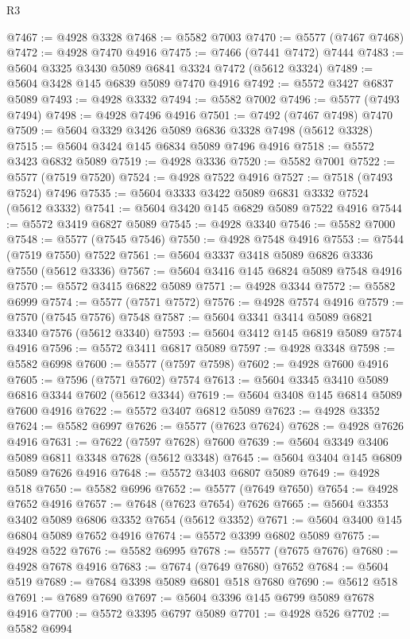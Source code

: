 \begin{lexlean}{R3}
\begin{coremodule}
@7467 := @4928 @3328
@7468 := @5582 @7003
@7470 := @5577 (@7467 @7468)
@7472 := @4928 @7470 @4916
@7475 := @7466 (@7441 @7472) @7444
@7483 := @5604 @3325 @3430 @5089 @6841 @3324 @7472 (@5612 @3324)
@7489 := @5604 @3428 @145 @6839 @5089 @7470 @4916
@7492 := @5572 @3427 @6837 @5089
@7493 := @4928 @3332
@7494 := @5582 @7002
@7496 := @5577 (@7493 @7494)
@7498 := @4928 @7496 @4916
@7501 := @7492 (@7467 @7498) @7470
@7509 := @5604 @3329 @3426 @5089 @6836 @3328 @7498 (@5612 @3328)
@7515 := @5604 @3424 @145 @6834 @5089 @7496 @4916
@7518 := @5572 @3423 @6832 @5089
@7519 := @4928 @3336
@7520 := @5582 @7001
@7522 := @5577 (@7519 @7520)
@7524 := @4928 @7522 @4916
@7527 := @7518 (@7493 @7524) @7496
@7535 := @5604 @3333 @3422 @5089 @6831 @3332 @7524 (@5612 @3332)
@7541 := @5604 @3420 @145 @6829 @5089 @7522 @4916
@7544 := @5572 @3419 @6827 @5089
@7545 := @4928 @3340
@7546 := @5582 @7000
@7548 := @5577 (@7545 @7546)
@7550 := @4928 @7548 @4916
@7553 := @7544 (@7519 @7550) @7522
@7561 := @5604 @3337 @3418 @5089 @6826 @3336 @7550 (@5612 @3336)
@7567 := @5604 @3416 @145 @6824 @5089 @7548 @4916
@7570 := @5572 @3415 @6822 @5089
@7571 := @4928 @3344
@7572 := @5582 @6999
@7574 := @5577 (@7571 @7572)
@7576 := @4928 @7574 @4916
@7579 := @7570 (@7545 @7576) @7548
@7587 := @5604 @3341 @3414 @5089 @6821 @3340 @7576 (@5612 @3340)
@7593 := @5604 @3412 @145 @6819 @5089 @7574 @4916
@7596 := @5572 @3411 @6817 @5089
@7597 := @4928 @3348
@7598 := @5582 @6998
@7600 := @5577 (@7597 @7598)
@7602 := @4928 @7600 @4916
@7605 := @7596 (@7571 @7602) @7574
@7613 := @5604 @3345 @3410 @5089 @6816 @3344 @7602 (@5612 @3344)
@7619 := @5604 @3408 @145 @6814 @5089 @7600 @4916
@7622 := @5572 @3407 @6812 @5089
@7623 := @4928 @3352
@7624 := @5582 @6997
@7626 := @5577 (@7623 @7624)
@7628 := @4928 @7626 @4916
@7631 := @7622 (@7597 @7628) @7600
@7639 := @5604 @3349 @3406 @5089 @6811 @3348 @7628 (@5612 @3348)
@7645 := @5604 @3404 @145 @6809 @5089 @7626 @4916
@7648 := @5572 @3403 @6807 @5089
@7649 := @4928 @518
@7650 := @5582 @6996
@7652 := @5577 (@7649 @7650)
@7654 := @4928 @7652 @4916
@7657 := @7648 (@7623 @7654) @7626
@7665 := @5604 @3353 @3402 @5089 @6806 @3352 @7654 (@5612 @3352)
@7671 := @5604 @3400 @145 @6804 @5089 @7652 @4916
@7674 := @5572 @3399 @6802 @5089
@7675 := @4928 @522
@7676 := @5582 @6995
@7678 := @5577 (@7675 @7676)
@7680 := @4928 @7678 @4916
@7683 := @7674 (@7649 @7680) @7652
@7684 := @5604 @519
@7689 := @7684 @3398 @5089 @6801 @518 @7680
@7690 := @5612 @518
@7691 := @7689 @7690
@7697 := @5604 @3396 @145 @6799 @5089 @7678 @4916
@7700 := @5572 @3395 @6797 @5089
@7701 := @4928 @526
@7702 := @5582 @6994

\end{coremodule}
\end{lexlean}
